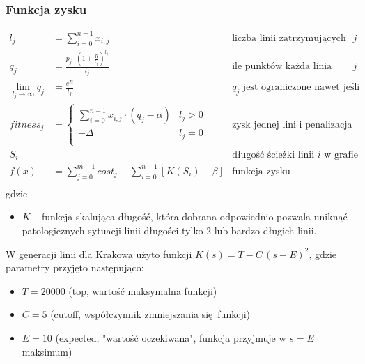 \documentclass[12pt,a4paper]{article}
\begin{document}
\subsubsection{Funkcja zysku}
\begin{align*}
    l_j                         & = \sum_{i=0}^{n-1} x_{i, j}                                               & \text{liczba linii zatrzymujących się na przystanku $j$}                 \\
    q_j                         & = \frac{p_j \cdot (1+\frac{R}{l_j})^{l_j}}{l_j}                           & \text{ile punktów każda linia uzyskuje z przystanku $j$}                 \\
    \lim_{l_{j}\to\infty} q_{j} & =  \frac{e^R}{l_j}                                                        & \text{$q_{j}$ jest ograniczone nawet jeśli liczba lini jest bardzo duża} \\
    fitness_{j}                    & = \begin{cases}
        \sum_{i=0}^{n-1} x_{i,j} \cdot (q_j-\alpha) & l_j > 0 \\
        -\Delta                                     & l_j = 0 \\
    \end{cases}                                               & \text{zysk jednej lini  i penalizacja nieodwiedzonych przystanków}                           \\
    S_{i}                       &                                                                           & \text{długość ścieżki linii $i$ w grafie}                                \\
    f(x)                        & = \sum_{j=0}^{m-1} cost_{j} - \sum_{i=0}^{n-1} \left[ K(S_{i})-\beta \right] & \text{funkcja zysku}                                                    \\
\end{align*}
gdzie
\begin{itemize}
	\item $K$ -- funkcja skalująca długość, która dobrana odpowiednio pozwala uniknąć patologicznych sytuacji linii długości tylko 2 lub bardzo długich linii.
\end{itemize}

W generacji linii dla Krakowa użyto funkcji $K(s) = T - C \, (s - E)^2$, gdzie parametry przyjęto następująco:
\begin{itemize}
	\item $T=20000$ (top, wartość maksymalna funkcji)
	\item $C=5$ (cutoff, współczynnik zmniejszania się funkcji)
	\item $E=10$ (expected, "wartość oczekiwana", funkcja przyjmuje w $s=E$ maksimum)
\end{itemize}
\end{document}
